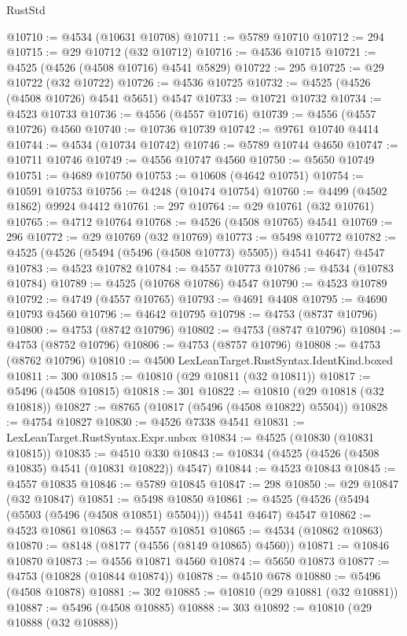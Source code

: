 \begin{lexlean}{RustStd}
\begin{coremodule}
{\begin{coremodule}
{{{{{{{{{{{{{{{{{{{{{{{{{{{{{{{{{{{{{{{{{{{{{{{{{{{{{{{@10710 := @4534 (@10631 @10708)
@10711 := @5789 @10710
@10712 := 294
@10715 := @29 @10712 (@32 @10712)
@10716 := @4536 @10715
@10721 := @4525 (@4526 (@4508 @10716) @4541 @5829)
@10722 := 295
@10725 := @29 @10722 (@32 @10722)
@10726 := @4536 @10725
@10732 := @4525 (@4526 (@4508 @10726) @4541 @5651) @4547
@10733 := @10721 @10732
@10734 := @4523 @10733
@10736 := @4556 (@4557 @10716)
@10739 := @4556 (@4557 @10726) @4560
@10740 := @10736 @10739
@10742 := @9761 @10740 @4414
@10744 := @4534 (@10734 @10742)
@10746 := @5789 @10744 @4650
@10747 := @10711 @10746
@10749 := @4556 @10747 @4560
@10750 := @5650 @10749
@10751 := @4689 @10750
@10753 := @10608 (@4642 @10751)
@10754 := @10591 @10753
@10756 := @4248 (@10474 @10754)
@10760 := @4499 (@4502 @1862) @9924 @4412
@10761 := 297
@10764 := @29 @10761 (@32 @10761)
@10765 := @4712 @10764
@10768 := @4526 (@4508 @10765) @4541
@10769 := 296
@10772 := @29 @10769 (@32 @10769)
@10773 := @5498 @10772
@10782 := @4525 (@4526 (@5494 (@5496 (@4508 @10773) @5505)) @4541 @4647) @4547
@10783 := @4523 @10782
@10784 := @4557 @10773
@10786 := @4534 (@10783 @10784)
@10789 := @4525 (@10768 @10786) @4547
@10790 := @4523 @10789
@10792 := @4749 (@4557 @10765)
@10793 := @4691 @4408
@10795 := @4690 @10793 @4560
@10796 := @4642 @10795
@10798 := @4753 (@8737 @10796)
@10800 := @4753 (@8742 @10796)
@10802 := @4753 (@8747 @10796)
@10804 := @4753 (@8752 @10796)
@10806 := @4753 (@8757 @10796)
@10808 := @4753 (@8762 @10796)
@10810 := @4500 LexLeanTarget.RustSyntax.IdentKind.boxed
@10811 := 300
@10815 := @10810 (@29 @10811 (@32 @10811))
@10817 := @5496 (@4508 @10815)
@10818 := 301
@10822 := @10810 (@29 @10818 (@32 @10818))
@10827 := @8765 (@10817 (@5496 (@4508 @10822) @5504))
@10828 := @4754 @10827
@10830 := @4526 @7338 @4541
@10831 := LexLeanTarget.RustSyntax.Expr.unbox
@10834 := @4525 (@10830 (@10831 @10815))
@10835 := @4510 @330
@10843 := @10834 (@4525 (@4526 (@4508 @10835) @4541 (@10831 @10822)) @4547)
@10844 := @4523 @10843
@10845 := @4557 @10835
@10846 := @5789 @10845
@10847 := 298
@10850 := @29 @10847 (@32 @10847)
@10851 := @5498 @10850
@10861 := @4525 (@4526 (@5494 (@5503 (@5496 (@4508 @10851) @5504))) @4541 @4647) @4547
@10862 := @4523 @10861
@10863 := @4557 @10851
@10865 := @4534 (@10862 @10863)
@10870 := @8148 (@8177 (@4556 (@8149 @10865) @4560))
@10871 := @10846 @10870
@10873 := @4556 @10871 @4560
@10874 := @5650 @10873
@10877 := @4753 (@10828 (@10844 @10874))
@10878 := @4510 @678
@10880 := @5496 (@4508 @10878)
@10881 := 302
@10885 := @10810 (@29 @10881 (@32 @10881))
@10887 := @5496 (@4508 @10885)
@10888 := 303
@10892 := @10810 (@29 @10888 (@32 @10888))
}}}}}}}}}}}}}}}}}}}}}}}}}}}}}}}}}}}}}}}}}}}}}}}}}}}}}}}
\end{coremodule}}
\end{coremodule}
\end{lexlean}
